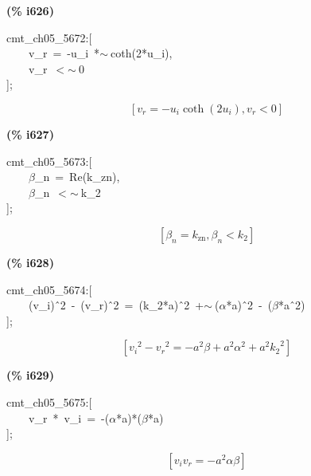 \documentclass[fleqn]{article}
\begin{document}
\noindent
\begin{minipage}[t]{4.000000em}\color{red}\bfseries
(\% i626)	
\end{minipage}
\begin{minipage}[t]{\textwidth}\color{blue}
cmt\_ch05\_5672:[\\
\ \ \ \ v\_r\ =\ -u\_i\ *\ensuremath{\sim\ }coth(2*u\_i),\\
\ \ \ \ v\_r\ \ensuremath{<}\ensuremath{\sim\ }0\\
];
\end{minipage}
\[\displaystyle \tag{\% o626} 
\left[ {v_r}=-{u_i} \operatorname{coth}\left( 2 {u_i}\right) \operatorname{,}{v_r}\operatorname{<  }0\right] \mbox{}
\]


\noindent
\begin{minipage}[t]{4.000000em}\color{red}\bfseries
(\% i627)	
\end{minipage}
\begin{minipage}[t]{\textwidth}\color{blue}
cmt\_ch05\_5673:[\\
\ \ \ \ \ensuremath{\beta}\_n\ =\ Re(k\_zn),\ \\
\ \ \ \ \ensuremath{\beta}\_n\ \ensuremath{<}\ensuremath{\sim\ }k\_2\\
];
\end{minipage}
\[\displaystyle \tag{\% o627} 
\left[ {{\beta }_n}={k_{\ensuremath{\mathrm{zn}}}}\operatorname{,}{{\beta }_n}\operatorname{<  }{k_2}\right] \mbox{}
\]


\noindent
\begin{minipage}[t]{4.000000em}\color{red}\bfseries
(\% i628)	
\end{minipage}
\begin{minipage}[t]{\textwidth}\color{blue}
cmt\_ch05\_5674:[\\
\ \ \ \ (v\_i)\^\ 2\ -\ (v\_r)\^\ 2\ =\ (k\_2*a)\^\ 2\ +\ensuremath{\sim\ }(\ensuremath{\alpha}*a)\^\ 2\ -\ (\ensuremath{\beta}*a\^\ 2)\\
];
\end{minipage}
\[\displaystyle \tag{\% o628} 
\left[ {{{v_i}}^{2}}-{{{v_r}}^{2}}=-{{a}^{2}} \beta +{{a}^{2}} {{\alpha }^{2}}+{{a}^{2}} {{{k_2}}^{2}}\right] \mbox{}
\]


\noindent
\begin{minipage}[t]{4.000000em}\color{red}\bfseries
(\% i629)	
\end{minipage}
\begin{minipage}[t]{\textwidth}\color{blue}
cmt\_ch05\_5675:[\\
\ \ \ \ v\_r\ *\ v\_i\ =\ -(\ensuremath{\alpha}*a)*(\ensuremath{\beta}*a)\\
];
\end{minipage}
\[\displaystyle \tag{\% o629} 
\left[ {v_i} {v_r}=-{{a}^{2}} \alpha  \beta \right] \mbox{}
\]
\end{document}
